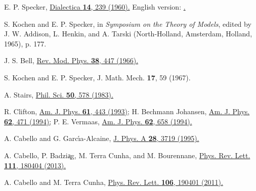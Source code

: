 \documentclass[%
  twocolumn,
 showpacs,
 showkeys,
 preprintnumbers,
 amsmath,amssymb,
 aps,
  pra,
  longbibliography,
 floatfix,
 ]{revtex4-1}
\begin{document}

\begin{thebibliography}{99}

 E. P. Specker,
 \href{http://onlinelibrary.wiley.com/doi/10.1111/j.1746-8361.1960.tb00422.x/abstract}{Dialectica \textbf{14}, 239 (1960).}
 English version: \href{http://arxiv.org/abs/1103.4537}{.}

 S. Kochen and E. P. Specker,
 in {\it Symposium on the Theory of Models}, edited by J. W. Addison, L. Henkin, and A. Tarski
 (North-Holland, Amsterdam, Holland, 1965), p. 177.

 J. S. Bell,
 \href{http://journals.aps.org/rmp/abstract/10.1103/RevModPhys.38.447}{Rev. Mod. Phys. \textbf{38}, 447 (1966).}

 S. Kochen and E. P. Specker,
 J. Math. Mech. \textbf{17}, 59 (1967).


 A. Stairs,
 \href{http://www.jstor.org/discover/10.2307/187557?uid=3737952&uid=2&uid=4&sid=21103727445967}{Phil. Sci. \textbf{50}, 578 (1983).}

 R. Clifton,
 \href{http://scitation.aip.org/content/aapt/journal/ajp/61/5/10.1119/1.17239}{Am. J. Phys. \textbf{61}, 443 (1993);}
 H. Bechmann Johansen,
 \href{http://scitation.aip.org/content/aapt/journal/ajp/62/5/10.1119/1.17551}{Am. J. Phys. \textbf{62}, 471 (1994);}
 P. E. Vermaas,
 \href{http://scitation.aip.org/content/aapt/journal/ajp/62/7/10.1119/1.17488}{Am. J. Phys. \textbf{62}, 658 (1994).}

 A. Cabello and G. Garc\'{\i}a-Alcaine,
 \href{http://iopscience.iop.org/0305-4470/28/13/016/}{J. Phys. A \textbf{28}, 3719 (1995).}

 A. Cabello, P. Badzi{\c a}g, M. Terra Cunha, and M. Bourennane,
 \href{http://dx.doi.org/10.1103/PhysRevLett.111.180404 }{Phys. Rev. Lett. \textbf{111}, 180404 (2013).}

 A. Cabello and M. Terra Cunha,
 \href{http://dx.doi.org/10.1103/PhysRevLett.106.190401}{Phys. Rev. Lett. \textbf{106}, 190401 (2011).}


\end{thebibliography}
\end{document}
